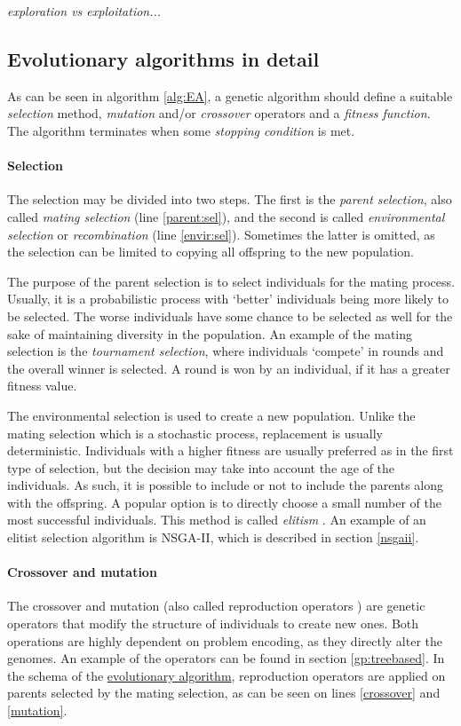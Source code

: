 \textit{exploration vs exploitation...}

\subsection{Evolutionary algorithms in detail}
As can be seen in algorithm \ref{alg:EA}, a genetic algorithm should 
define a suitable \emph{selection} method, \emph{mutation} and/or 
\emph{crossover} operators and a \emph{fitness function}.
The algorithm terminates when some \emph{stopping condition} is met. 

\paragraph{Selection}
The selection may be divided into two steps. The first is the 
\emph{parent selection}, also called \emph{mating selection}
(line \ref{parent:sel}), and the second is called
\emph{environmental selection} or \emph{recombination} (line \ref{envir:sel}).
Sometimes the latter is omitted, as the selection can be limited to copying 
all offspring to the new population.

The purpose of the parent selection is to select individuals for the
mating process. Usually, it is a probabilistic process with `better'
individuals being more likely to be selected. The worse individuals have some
chance to be selected as well for the sake of maintaining diversity in the
population. An example of the mating selection is the
\emph{tournament selection}, where individuals `compete' in rounds and the
overall winner is selected. A round is won by an individual, if it has a 
greater fitness value.

The environmental selection is used to create a new 
population. Unlike the mating selection which is a stochastic process,
replacement is usually deterministic. Individuals with a higher fitness are
usually preferred as in the first type of selection, but the decision may take 
into account the age of the individuals. As such, it is possible to include 
or not to include the parents along with the offspring. A popular option is to 
directly choose a small number of the most successful individuals. This method 
is called \emph{elitism} \citep{Eiben:2015:IEC:2810085}.
An example of an elitist selection algorithm is NSGA-II, which
is described in section \ref{nsgaii}.

\paragraph{Crossover and mutation}
The crossover and mutation (also called reproduction operators
\citep{Engelbrecht:2007:CII:1557464}) are genetic operators that modify the
structure of individuals to create new ones. Both operations are highly
dependent on problem encoding, as they directly alter the genomes. An example
of the operators can be found in section \ref{gp:treebased}. In the schema 
of the \hyperref[alg:EA]{evolutionary algorithm}, reproduction operators
are applied on parents selected by the mating selection, as can be seen on 
lines \ref{crossover} and \ref{mutation}.

